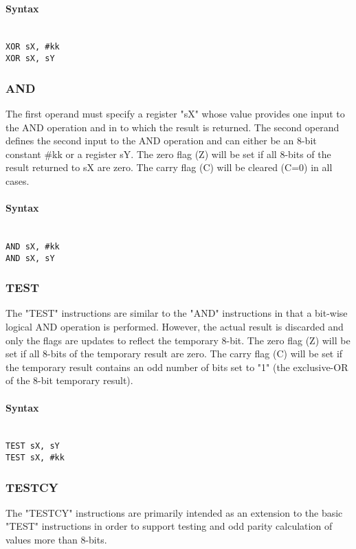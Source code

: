             \paragraph{Syntax}
                ~\\
                \verb'XOR sX, #kk'\\
                \verb'XOR sX, sY'

        \subsubsection{AND}
            The first operand must specify a register "sX" whose value provides one input to the AND operation and in to which the result is returned. The second operand defines the second input to the AND operation and can either be an 8-bit constant \#kk or a register sY. The zero flag (Z) will be set if all 8-bits of the result returned to sX are zero. The carry flag (C) will be cleared (C=0) in all cases.

            \paragraph{Syntax}
                ~\\
                \verb'AND sX, #kk'\\
                \verb'AND sX, sY'

        \subsubsection{TEST}
            The "TEST" instructions are similar to the "AND" instructions in that a bit-wise logical AND operation is performed. However, the actual result is discarded and only the flags are updates to reflect the temporary 8-bit. The zero flag (Z) will be set if all 8-bits of the temporary result are zero. The carry flag (C) will be set if the temporary result contains an odd number of bits set to "1" (the exclusive-OR of the 8-bit temporary result).

            \paragraph{Syntax}
                ~\\
                \verb'TEST sX, sY'\\
                \verb'TEST sX, #kk'

        \subsubsection{TESTCY}
            The "TESTCY" instructions are primarily intended as an extension to the basic "TEST" instructions in order to support testing and odd parity calculation of values more than 8-bits.

